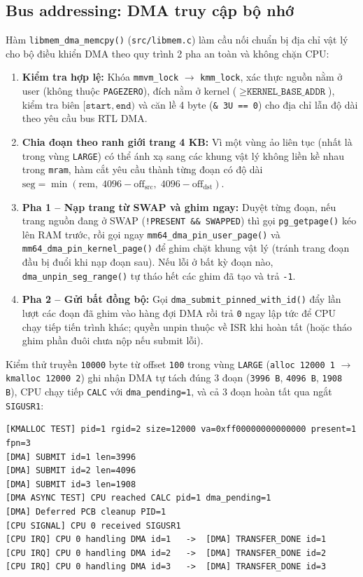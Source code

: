 \documentclass[12pt,a4paper]{article}
\begin{document}
	\subsection{Bus addressing: DMA truy cập bộ nhớ}
	Hàm \texttt{libmem\_dma\_memcpy()} (\texttt{src/libmem.c}) làm cầu nối chuẩn bị địa chỉ vật lý cho bộ điều khiển DMA theo quy trình 2 pha an toàn và không chặn CPU:
	\begin{enumerate}[leftmargin=*]
		\item \textbf{Kiểm tra hợp lệ:} Khóa \texttt{mmvm\_lock} $\to$ \texttt{kmm\_lock}, xác thực nguồn nằm ở user (không thuộc \texttt{PAGEZERO}), đích nằm ở kernel ($\ge \texttt{KERNEL\_BASE\_ADDR}$), kiểm tra biên $[\texttt{start}, \texttt{end})$ và căn lề 4 byte (\texttt{\& 3U == 0}) cho địa chỉ lẫn độ dài theo yêu cầu bus RTL DMA.
		\item \textbf{Chia đoạn theo ranh giới trang 4 KB:} Vì một vùng ảo liên tục (nhất là trong vùng \texttt{LARGE}) có thể ánh xạ sang các khung vật lý không liền kề nhau trong \texttt{mram}, hàm cắt yêu cầu thành từng đoạn có độ dài $\text{seg} = \min(\text{rem},\; 4096 - \text{off}_{\text{src}},\; 4096 - \text{off}_{\text{dst}})$.
		\item \textbf{Pha 1 -- Nạp trang từ SWAP và ghim ngay:} Duyệt từng đoạn, nếu trang nguồn đang ở SWAP (\texttt{!PRESENT \&\& SWAPPED}) thì gọi \texttt{pg\_getpage()} kéo lên RAM trước, rồi gọi ngay \texttt{mm64\_dma\_pin\_user\_page()} và \texttt{mm64\_dma\_pin\_kernel\_page()} để ghim chặt khung vật lý (tránh trang đoạn đầu bị đuổi khi nạp đoạn sau). Nếu lỗi ở bất kỳ đoạn nào, \texttt{dma\_unpin\_seg\_range()} tự tháo hết các ghim đã tạo và trả \texttt{-1}.
		\item \textbf{Pha 2 -- Gửi bất đồng bộ:} Gọi \texttt{dma\_submit\_pinned\_with\_id()} đẩy lần lượt các đoạn đã ghim vào hàng đợi DMA rồi trả \texttt{0} ngay lập tức để CPU chạy tiếp tiến trình khác; quyền unpin thuộc về ISR khi hoàn tất (hoặc tháo ghim phần đuôi chưa nộp nếu submit lỗi).
	\end{enumerate}

	Kiểm thử truyền \texttt{10000} byte từ offset \texttt{100} trong vùng \texttt{LARGE} (\texttt{alloc 12000 1} $\to$ \texttt{kmalloc 12000 2}) ghi nhận DMA tự tách đúng 3 đoạn (\texttt{3996 B}, \texttt{4096 B}, \texttt{1908 B}), CPU chạy tiếp \texttt{CALC} với \texttt{dma\_pending=1}, và cả 3 đoạn hoàn tất qua ngắt \texttt{SIGUSR1}:

\begin{lstlisting}[caption={Output DMA vắt qua 3 trang vật lý (10000 B tại offset 100)}]
[KMALLOC TEST] pid=1 rgid=2 size=12000 va=0xff00000000000000 present=1 fpn=3
[DMA] SUBMIT id=1 len=3996
[DMA] SUBMIT id=2 len=4096
[DMA] SUBMIT id=3 len=1908
[DMA ASYNC TEST] CPU reached CALC pid=1 dma_pending=1
[DMA] Deferred PCB cleanup PID=1
[CPU SIGNAL] CPU 0 received SIGUSR1
[CPU IRQ] CPU 0 handling DMA id=1   ->  [DMA] TRANSFER_DONE id=1
[CPU IRQ] CPU 0 handling DMA id=2   ->  [DMA] TRANSFER_DONE id=2
[CPU IRQ] CPU 0 handling DMA id=3   ->  [DMA] TRANSFER_DONE id=3
\end{lstlisting}
\end{document}
